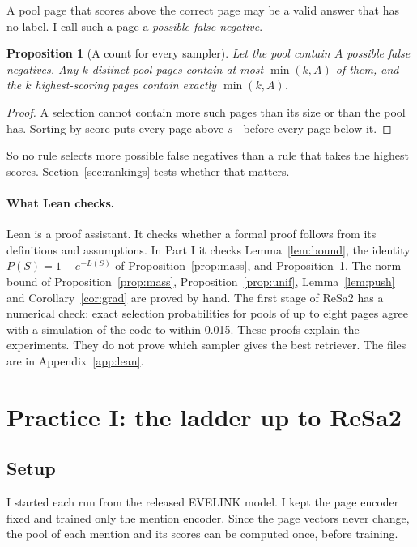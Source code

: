 \documentclass[11pt]{article}
\newtheorem{proposition}{Proposition}
\theoremstyle{definition}
\begin{document}
A pool page that scores above the correct page may be a valid answer that has no label. I call such a page a \emph{possible false negative}.

\begin{proposition}[A count for every sampler]
\label{prop:bound}
Let the pool contain $A$ possible false negatives. Any $k$ distinct pool pages contain at most $\min(k, A)$ of them, and the $k$ highest-scoring pages contain exactly $\min(k, A)$.
\end{proposition}
\begin{proof}
A selection cannot contain more such pages than its size or than the pool has. Sorting by score puts every page above $s^{+}$ before every page below it.
\end{proof}

So no rule selects more possible false negatives than a rule that takes the highest scores. Section~\ref{sec:rankings} tests whether that matters.

\paragraph{What Lean checks.}
\label{sec:lean}
Lean is a proof assistant. It checks whether a formal proof follows from its definitions and assumptions. In Part I it checks Lemma~\ref{lem:bound}, the identity $P(S) = 1 - e^{-L(S)}$ of Proposition~\ref{prop:mass}, and Proposition~\ref{prop:bound}. The norm bound of Proposition~\ref{prop:mass}, Proposition~\ref{prop:unif}, Lemma~\ref{lem:push} and Corollary~\ref{cor:grad} are proved by hand. The first stage of ReSa2 has a numerical check: exact selection probabilities for pools of up to eight pages agree with a simulation of the code to within 0.015. These proofs explain the experiments. They do not prove which sampler gives the best retriever. The files are in Appendix~\ref{app:lean}.

\section{Practice I: the ladder up to ReSa2}
\label{sec:experiments}

\subsection{Setup}

I started each run from the released EVELINK model. I kept the page encoder fixed and trained only the mention encoder. Since the page vectors never change, the pool of each mention and its scores can be computed once, before training.
\end{document}
